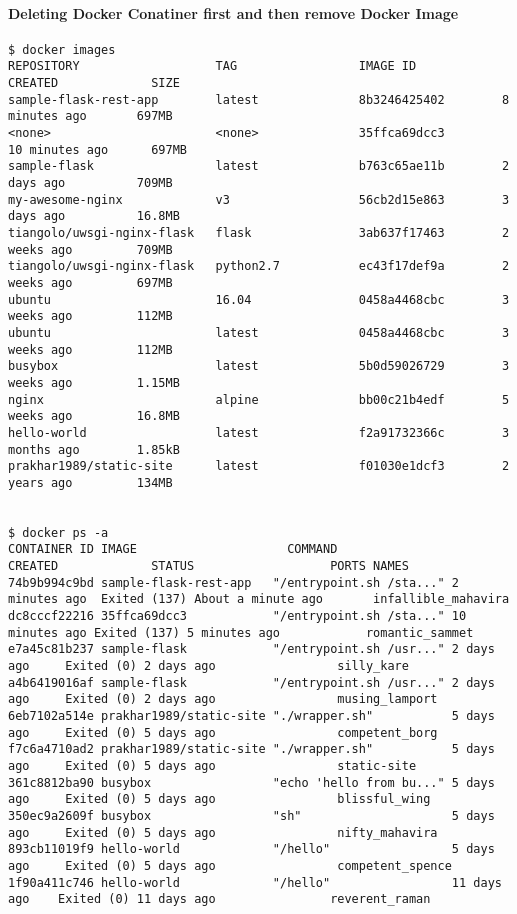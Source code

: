 \paragraph{Deleting Docker Conatiner first and then remove Docker Image}


\begin{lstlisting}[basicstyle=\tiny]
$ docker images
REPOSITORY                   TAG                 IMAGE ID            CREATED             SIZE
sample-flask-rest-app        latest              8b3246425402        8 minutes ago       697MB
<none>                       <none>              35ffca69dcc3        10 minutes ago      697MB
sample-flask                 latest              b763c65ae11b        2 days ago          709MB
my-awesome-nginx             v3                  56cb2d15e863        3 days ago          16.8MB
tiangolo/uwsgi-nginx-flask   flask               3ab637f17463        2 weeks ago         709MB
tiangolo/uwsgi-nginx-flask   python2.7           ec43f17def9a        2 weeks ago         697MB
ubuntu                       16.04               0458a4468cbc        3 weeks ago         112MB
ubuntu                       latest              0458a4468cbc        3 weeks ago         112MB
busybox                      latest              5b0d59026729        3 weeks ago         1.15MB
nginx                        alpine              bb00c21b4edf        5 weeks ago         16.8MB
hello-world                  latest              f2a91732366c        3 months ago        1.85kB
prakhar1989/static-site      latest              f01030e1dcf3        2 years ago         134MB


$ docker ps -a
CONTAINER ID IMAGE                     COMMAND                  CREATED             STATUS                   PORTS NAMES
74b9b994c9bd sample-flask-rest-app   "/entrypoint.sh /sta..." 2 minutes ago  Exited (137) About a minute ago       infallible_mahavira
dc8cccf22216 35ffca69dcc3            "/entrypoint.sh /sta..." 10 minutes ago Exited (137) 5 minutes ago            romantic_sammet
e7a45c81b237 sample-flask            "/entrypoint.sh /usr..." 2 days ago     Exited (0) 2 days ago                 silly_kare
a4b6419016af sample-flask            "/entrypoint.sh /usr..." 2 days ago     Exited (0) 2 days ago                 musing_lamport
6eb7102a514e prakhar1989/static-site "./wrapper.sh"           5 days ago     Exited (0) 5 days ago                 competent_borg
f7c6a4710ad2 prakhar1989/static-site "./wrapper.sh"           5 days ago     Exited (0) 5 days ago                 static-site
361c8812ba90 busybox                 "echo 'hello from bu..." 5 days ago     Exited (0) 5 days ago                 blissful_wing
350ec9a2609f busybox                 "sh"                     5 days ago     Exited (0) 5 days ago                 nifty_mahavira
893cb11019f9 hello-world             "/hello"                 5 days ago     Exited (0) 5 days ago                 competent_spence
1f90a411c746 hello-world             "/hello"                 11 days ago    Exited (0) 11 days ago                reverent_raman



\end{lstlisting}
